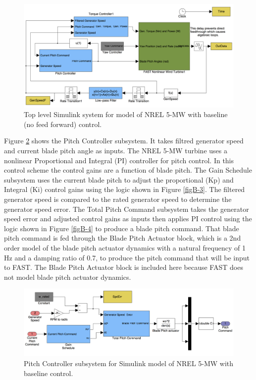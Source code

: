  \begin{figure}[ht]
	\centering
		\includegraphics[width=\linewidth]{Figures/AppendixBFigures/baseline1.png}
	\caption{Top level Simulink system for model of NREL 5-MW with baseline (no feed forward) control.}
	\label{figB-1}
\end{figure}

Figure \ref{figB-2} shows the Pitch Controller subsystem. It takes filtred generator speed and current blade pitch angle as inputs. The NREL 5-MW turbine uses a nonlinear Proportional and Integral (PI) controller for pitch control. In this control scheme the control gains are a function of blade pitch. The Gain Schedule subsystem uses the current blade pitch to adjust the proportional (Kp) and Integral (Ki) control gains using the logic shown in Figure \ref{figB-3}. The filtered generator speed is compared to the rated generator speed to determine the generator speed error. The Total Pitch Command subsystem takes the generator speed error and adjusted control gains as inputs then applies PI control using the logic shown in Figure \ref{figB-4} to produce a blade pitch command. That blade pitch command is fed through the Blade Pitch Actuator block, which is a 2nd order model of the blade pitch actuator dynamics with a natural frequency of 1 Hz and a damping ratio of 0.7, to produce the pitch command that will be input to FAST. The Blade Pitch Actuator block is included here because FAST does not model blade pitch actuator dynamics.

 \begin{figure}[ht]
	\centering
		\includegraphics[width=\linewidth]{Figures/AppendixBFigures/baseline2.png}
	\caption{Pitch Controller subsystem for Simulink model of NREL 5-MW with baseline control.}
	\label{figB-2}
\end{figure}

